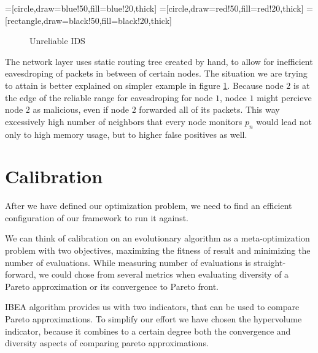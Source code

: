 \documentclass[12pt,oneside]{fithesis2}
\begin{document}
=[circle,draw=blue!50,fill=blue!20,thick]
=[circle,draw=red!50,fill=red!20,thick]
=[rectangle,draw=black!50,fill=black!20,thick]
\begin{figure}[htb!]
\caption{Unreliable IDS}
\label{boinc3}
\centering
{}
\end{figure}
The network layer uses static routing tree created by hand, to allow for inefficient eavesdroping of packets in between of certain nodes. The situation we are trying to attain is better explained on simpler example in figure \ref{boinc3}. Because node $2$ is at the edge of the reliable range for eavesdroping for node $1$, nodee $1$ might percieve node $2$ as malicious, even if node $2$ forwarded all of its packets. This way excessively high number of neighbors that every node monitors $p_n$ would lead not only to high memory usage, but to higher false positives as well.

\chapter{Calibration}
\label{chap:calib}
After we have defined our optimization problem, we need to find an efficient configuration of our framework to run it against.

We can think of calibration on an evolutionary algorithm as a meta-optimization problem with two objectives, maximizing the fitness of result and minimizing the number of evaluations. While measuring number of evaluations is straight-forward, we could chose from several metrics when evaluating diversity of a Pareto approximation or its convergence to Pareto front. 

IBEA algorithm provides us with two indicators, that can be used to compare Pareto approximations. To simplify our effort we have chosen the hypervolume indicator, because it combines to a certain degree both the convergence and diversity aspects of comparing pareto approximations.
\end{document}
